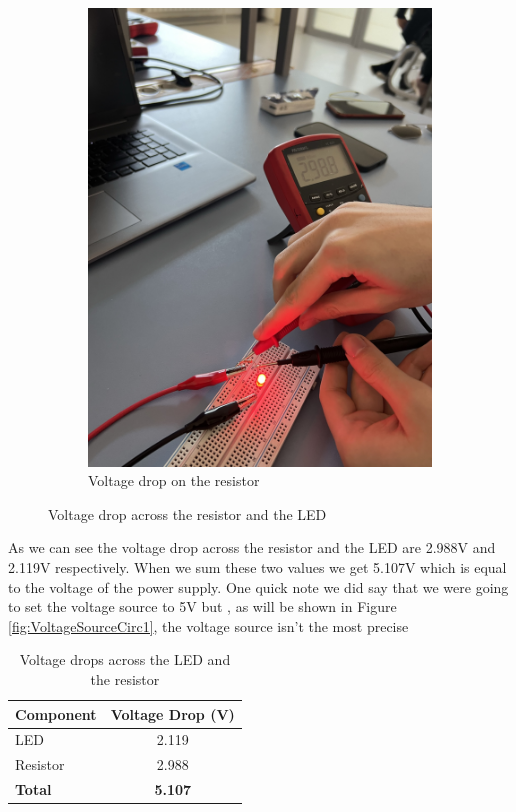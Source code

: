 \documentclass[a4paper, 10pt]{article}
\begin{document}
\begin{figure}[h!]
\begin{subfigure}[b]{0.35\textwidth}
					\includegraphics[width=\textwidth]{./images/Circ1_VDrop_Resistor.jpeg}
					\caption{Voltage drop on the resistor}
					\label{sub-fig:VDropResistorCirc1}
				\end{subfigure}
				\caption{Voltage drop across the resistor and the LED}
				\label{fig:circ1VDropResistorAndLED}
			\end{figure}

			As we can see the voltage drop across the resistor and the LED are 2.988V and 2.119V respectively. 
			When we sum these two values we get 5.107V which is equal to the voltage of the power supply.
			One quick note we did say that we were going to set the voltage source to 5V but , as will be shown in Figure \ref{fig:VoltageSourceCirc1},
			the voltage source isn't the most precise

			\begin{table}[h!]
				\centering
				\begin{tabular}{@{}l|S@{}} %
					\toprule
					{Component} & {Voltage Drop (\si{\volt})} \\
					\midrule
					LED & 2.119 \\ \hline
					Resistor & 2.988 \\ \hline
					\textbf{Total} & \textbf{5.107} \\
					\bottomrule
				\end{tabular}
				\caption{Voltage drops across the LED and the resistor}
				\label{tab:circ1VDrops}
			\end{table}
\end{document}
